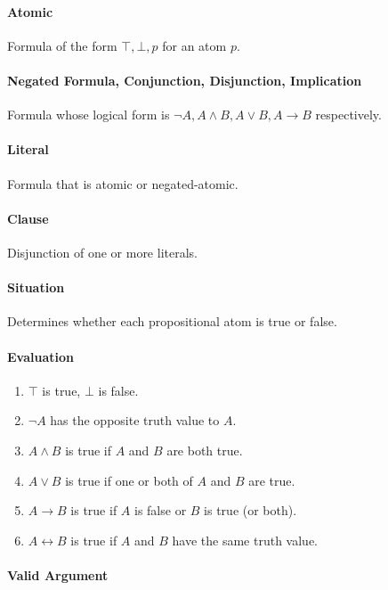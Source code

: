 \documentclass[10pt,twoside,twocolumn]{article}
\begin{document}
\paragraph{Atomic}

Formula of the form \textbf{$\top,\bot,p$ }for an atom $p$.


\paragraph{Negated Formula, Conjunction, Disjunction, Implication}

Formula whose logical form is $\lnot A,A\land B,A\lor B,A\rightarrow B$
respectively.


\paragraph{Literal}

Formula that is atomic or negated-atomic.


\paragraph{Clause}

Disjunction of one or more literals.


\paragraph{Situation}

Determines whether each propositional atom is true or false.


\paragraph{Evaluation}
\begin{enumerate}
\item $\top$ is true, $\bot$ is false.
\item $\lnot A$ has the opposite truth value to $A$.
\item $A\land B$ is true if $A$ and $B$ are both true.
\item $A\lor B$ is true if one or both of $A$ and $B$ are true.
\item $A\rightarrow B$ is true if $A$ is false or $B$ is true (or both).
\item $A\leftrightarrow B$ is true if $A$ and \textbf{$B$} have the same
truth value.
\end{enumerate}

\paragraph{Valid Argument}
\end{document}
